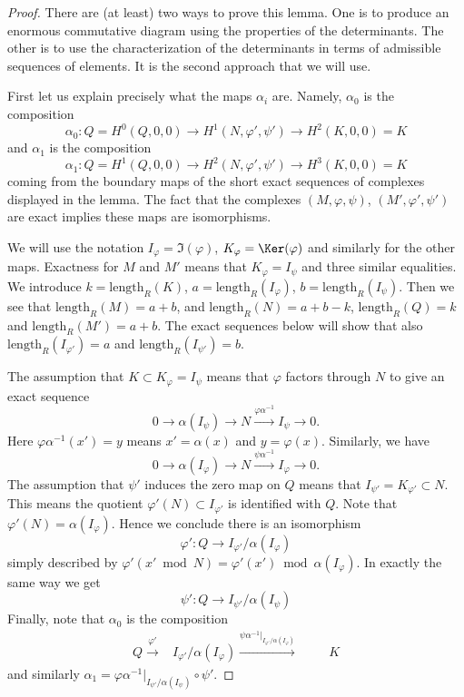 \begin{proof}

There are (at least) two ways to prove this lemma. One is to produce an
enormous commutative diagram using the properties of the determinants.
The other is to use the characterization of the determinants in terms
of admissible sequences of elements. It is the second approach that we
will use.

\medskip\noindent
First let us explain precisely what the maps $\alpha_i$ are.
Namely, $\alpha_0$ is the composition
$$
\alpha_0 : Q = H^0(Q, 0, 0) \to H^1(N, \varphi', \psi') \to H^2(K, 0, 0) = K
$$
and $\alpha_1$ is the composition
$$
\alpha_1 : Q = H^1(Q, 0, 0) \to H^2(N, \varphi', \psi') \to H^3(K, 0, 0) = K
$$
coming from the boundary maps of the short exact sequences of complexes
displayed in the lemma. The fact that the
complexes $(M, \varphi, \psi)$, $(M', \varphi', \psi')$ are exact
implies these maps are isomorphisms.

\medskip\noindent
We will use the notation $I_\varphi = \Im(\varphi)$,
$K_\varphi = \Ker(\varphi)$ and similarly for the other maps.
Exactness for $M$ and $M'$
means that $K_\varphi = I_\psi$ and three similar equalities.
We introduce $k = \text{length}_R(K)$, $a = \text{length}_R(I_\varphi)$,
$b = \text{length}_R(I_\psi)$. Then we see that $\text{length}_R(M) = a + b$,
and $\text{length}_R(N) = a + b - k$, $\text{length}_R(Q) = k$
and $\text{length}_R(M') = a + b$. The exact sequences below will show
that also $\text{length}_R(I_{\varphi'}) = a$ and
$\text{length}_R(I_{\psi'}) = b$.

\medskip\noindent
The assumption that $K \subset K_\varphi = I_\psi$ means that
$\varphi$ factors through $N$ to give an exact sequence
$$
0 \to \alpha(I_\psi) \to N \xrightarrow{\varphi\alpha^{-1}} I_\psi \to 0.
$$
Here $\varphi\alpha^{-1}(x') = y$ means $x' = \alpha(x)$ and $y = \varphi(x)$.
Similarly, we have
$$
0 \to \alpha(I_\varphi) \to N \xrightarrow{\psi\alpha^{-1}} I_\varphi \to 0.
$$
The assumption that $\psi'$ induces the zero map on
$Q$ means that $I_{\psi'} = K_{\varphi'} \subset N$.
This means the quotient $\varphi'(N) \subset I_{\varphi'}$
is identified with $Q$. Note that $\varphi'(N) = \alpha(I_\varphi)$.
Hence we conclude there is an isomorphism
$$
\varphi' : Q \to I_{\varphi'}/\alpha(I_\varphi)
$$
simply described by
$\varphi'(x' \bmod N) = \varphi'(x') \bmod \alpha(I_\varphi)$.
In exactly the same way we get
$$
\psi' : Q \to I_{\psi'}/\alpha(I_\psi)
$$
Finally, note that $\alpha_0$ is the composition
$$
\begin{array}{ccccc}Q \overset{\varphi'}{\longrightarrow} & I_{\varphi'}/\alpha(I_\varphi)
\overset{\psi\alpha^{-1}|_{I_{\varphi'}/\alpha(I_\varphi)}}{\longrightarrow} &  &  & K\end{array}
$$
and similarly
$\alpha_1 = \varphi\alpha^{-1}|_{I_{\psi'}/\alpha(I_\psi)} \circ \psi'$.


\end{proof}

